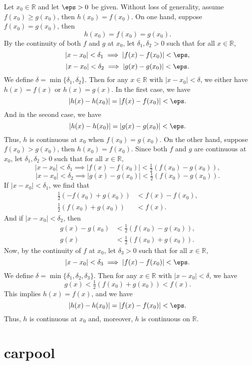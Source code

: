 \documentclass[12pt]{article}
\newcommand{\R}{\mathbb{R}}
\begin{document}
Let $x_0 \in \R$ and let $\eps > 0$ be given. Without loss of generality, assume $f(x_0) \geq g(x_0)$, then $h(x_0) = f(x_0)$. On one hand, suppose $f(x_0) = g(x_0)$, then
    \[
        h(x_0) = f(x_0) = g(x_0).
    \]
    By the continuity of both $f$ and $g$ at $x_0$, let $\delta_1, \delta_2 > 0$ such that for all $x \in \R$,
    \[
        |x - x_0| < \delta_1 \implies |f(x) - f(x_0)| < \eps,
    \]
    \[
        |x - x_0| < \delta_2 \implies |g(x) - g(x_0)| < \eps.
    \]
    We define $\delta = \min\{\delta_1, \delta_2\}$. Then for any $x \in \R$ with $|x - x_0| < \delta$, we either have $h(x) = f(x)$ or $h(x) = g(x)$. In the first case, we have
    \[
        |h(x) - h(x_0)| = |f(x) - f(x_0)| < \eps.
    \]
    And in the second case, we have
    \[
        |h(x) - h(x_0)| = |g(x) - g(x_0)| < \eps.
    \]
    Thus, $h$ is continuous at $x_0$ when $f(x_0) = g(x_0)$. On the other hand, suppose $f(x_0) > g(x_0)$, then
    $h(x_0) = f(x_0)$. Since both $f$ and $g$ are continuous at $x_0$, let $\delta_1, \delta_2  > 0$ such that for all $x \in \R$,
    \[
        |x - x_0| < \delta_1 \implies |f(x) - f(x_0)| < \tfrac12(f(x_0) - g(x_0)),
    \]
    \[
        |x - x_0| < \delta_2 \implies |g(x) - g(x_0)| < \tfrac12(f(x_0) - g(x_0)).
    \]
    If $|x - x_0| < \delta_1$, we find that
    \begin{align*}
        \tfrac12(- f(x_0) + g(x_0)) &< f(x) - f(x_0), \\
        \tfrac12(f(x_0) + g(x_0)) &< f(x).
    \end{align*}
    And if $|x - x_0| < \delta_2$, then
    \begin{align*}
        g(x) - g(x_0) &< \tfrac12(f(x_0) - g(x_0)), \\
        g(x) &< \tfrac12(f(x_0) + g(x_0)).
    \end{align*}
    Now, by the continuity of $f$ at $x_0$, let $\delta_3 > 0$ such that for all $x \in \R$,
    \[
        |x - x_0| < \delta_3 \implies |f(x) - f(x_0)| < \eps.
    \]
    We define $\delta = \min\{\delta_1, \delta_2, \delta_3\}$. Then for any $x \in \R$ with $|x - x_0| < \delta$, we have
    \[
        g(x) < \tfrac12(f(x_0) + g(x_0)) < f(x).
    \]
    This implies $h(x) = f(x)$, and we have
    \[
        |h(x) - h(x_0)| = |f(x) - f(x_0)| < \eps.
    \]
    Thus, $h$ is continuous at $x_0$ and, moreover, $h$ is continuous on $\R$.

\section{carpool}
\end{document}
